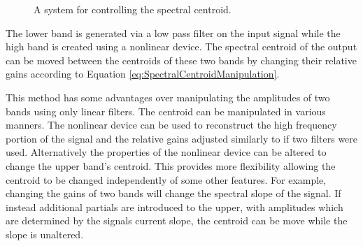 		\begin{figure}[h!]
			\centering
			\caption{A system for controlling the spectral centroid.}
			\label{fig:TwoBandSpectralCentroidSystem}
		\end{figure}

		The lower band is generated via a low pass filter on the input signal while the high band is created using
		a nonlinear device. The spectral centroid of the output can be moved between the centroids of these two
		bands by changing their relative gains according to Equation \ref{eq:SpectralCentroidManipulation}.

		This method has some advantages over manipulating the amplitudes of two bands using only linear filters.
		The centroid can be manipulated in various manners. The nonlinear device can be used to reconstruct the
		high frequency portion of the signal and the relative gains adjusted similarly to if two filters were used.
		Alternatively the properties of the nonlinear device can be altered to change the upper band's centroid.
		This provides more flexibility allowing the centroid to be changed independently of some other features.
		For example, changing the gains of two bands will change the spectral slope of the signal. If instead
		additional partials are introduced to the upper, with amplitudes which are determined by the signals
		current slope, the centroid can be move while the slope is unaltered.

